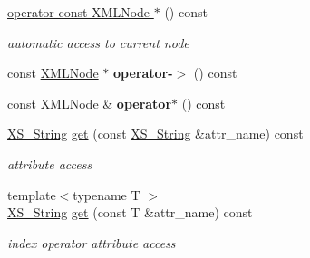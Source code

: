 \begin{DoxyCompactItemize}
\mbox{\label{struct_x_m_l_storage_1_1const___x_m_l_pos_a84f9307c47f8d447e0a23f024ab3dd22}} 
\hyperlink{struct_x_m_l_storage_1_1const___x_m_l_pos_a84f9307c47f8d447e0a23f024ab3dd22}{operator const X\+M\+L\+Node $\ast$} () const
\begin{DoxyCompactList}\small\item\em automatic access to current node \end{DoxyCompactList}\item 
\mbox{\label{struct_x_m_l_storage_1_1const___x_m_l_pos_a6bef5627e5f266d3a32ab9ddc24a33b2}} 
const \hyperlink{struct_x_m_l_storage_1_1_x_m_l_node}{X\+M\+L\+Node} $\ast$ {\bfseries operator-\/$>$} () const
\item 
\mbox{\label{struct_x_m_l_storage_1_1const___x_m_l_pos_a8d37f2a8d8348ac18305ef4994111147}} 
const \hyperlink{struct_x_m_l_storage_1_1_x_m_l_node}{X\+M\+L\+Node} \& {\bfseries operator$\ast$} () const
\item 
\mbox{\label{struct_x_m_l_storage_1_1const___x_m_l_pos_a095fbc75c6dfbb1b2b3e645f0fcea299}} 
\hyperlink{struct_x_m_l_storage_1_1_x_s___string}{X\+S\+\_\+\+String} \hyperlink{struct_x_m_l_storage_1_1const___x_m_l_pos_a095fbc75c6dfbb1b2b3e645f0fcea299}{get} (const \hyperlink{struct_x_m_l_storage_1_1_x_s___string}{X\+S\+\_\+\+String} \&attr\+\_\+name) const
\begin{DoxyCompactList}\small\item\em attribute access \end{DoxyCompactList}\item 
\mbox{\label{struct_x_m_l_storage_1_1const___x_m_l_pos_a2153e01b156b2310a6731be3ef6ebee8}} 
{\footnotesize template$<$typename T $>$ }\\\hyperlink{struct_x_m_l_storage_1_1_x_s___string}{X\+S\+\_\+\+String} \hyperlink{struct_x_m_l_storage_1_1const___x_m_l_pos_a2153e01b156b2310a6731be3ef6ebee8}{get} (const T \&attr\+\_\+name) const
\begin{DoxyCompactList}\small\item\em index operator attribute access \end{DoxyCompactList}\item 

\end{DoxyCompactItemize}
